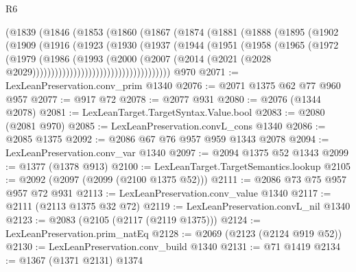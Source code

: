 \begin{lexlean}{R6}
\begin{coremodule}
                      (@1839
                        (@1846
                          (@1853
                            (@1860
                              (@1867
                                (@1874
                                  (@1881
                                    (@1888
                                      (@1895
                                        (@1902
                                          (@1909
                                            (@1916
                                              (@1923
                                                (@1930
                                                  (@1937
                                                    (@1944
                                                      (@1951
                                                        (@1958
                                                          (@1965
                                                            (@1972
                                                              (@1979
                                                                (@1986
                                                                  (@1993
                                                                    (@2000
                                                                      (@2007
                                                                        (@2014
                                                                          (@2021
                                                                            (@2028
                                                                              @2029)))))))))))))))))))))))))))))))))))))
    @970
@2071 := LexLeanPreservation.conv_prim @1340
@2076 := @2071 @1375 @62 @77 @960 @957
@2077 := @917 @72
@2078 := @2077 @931
@2080 := @2076 (@1344 @2078)
@2081 := LexLeanTarget.TargetSyntax.Value.bool
@2083 := @2080 (@2081 @970)
@2085 := LexLeanPreservation.convL_cons @1340
@2086 := @2085 @1375
@2092 := @2086 @67 @76 @957 @959 @1343 @2078
@2094 := LexLeanPreservation.conv_var @1340
@2097 := @2094 @1375 @52 @1343
@2099 := @1377 (@1378 @913)
@2100 := LexLeanTarget.TargetSemantics.lookup
@2105 := @2092 (@2097 (@2099 (@2100 @1375 @52)))
@2111 := @2086 @73 @75 @957 @957 @72 @931
@2113 := LexLeanPreservation.conv_value @1340
@2117 := @2111 (@2113 @1375 @32 @72)
@2119 := LexLeanPreservation.convL_nil @1340
@2123 := @2083 (@2105 (@2117 (@2119 @1375)))
@2124 := LexLeanPreservation.prim_natEq
@2128 := @2069 (@2123 (@2124 @919 @52))
@2130 := LexLeanPreservation.conv_build @1340
@2131 := @71 @1419
@2134 := @1367 (@1371 @2131) @1374

\end{coremodule}
\end{lexlean}
